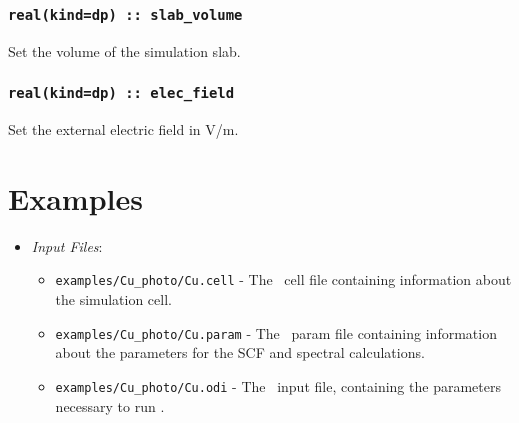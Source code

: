 \documentclass[a4paper,11pt,twoside]{book}
\begin{document}
\subsection[slab\_volume]{\tt real(kind=dp) :: slab\_volume}

Set the volume of the simulation slab.

\subsection[elec\_field]{\tt real(kind=dp) :: elec\_field}

Set the external electric field in V/m.

\chapter{Examples}

\begin{itemize}
This is an example of using photoemission module for calculating the photoemission properties of Cu(111) surface using a 16 atomic layers slab. 
\item \emph{Input Files}:
\begin{itemize}
\item \verb#examples/Cu_photo/Cu.cell# - The \castep\ cell file containing information about the simulation cell.
\item \verb#examples/Cu_photo/Cu.param# - The \castep\ param file containing information about the parameters for the SCF and spectral calculations.
\item \verb#examples/Cu_photo/Cu.odi# - The \optados\ input file, containing the parameters necessary to run \optados.
\end{itemize}
\end{itemize}
\end{document}
